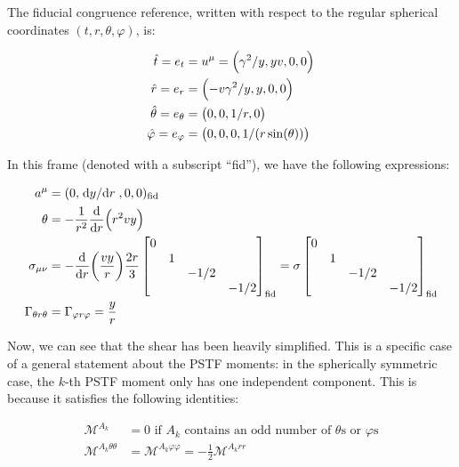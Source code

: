 \documentclass[main.tex]{subfiles}
\begin{document}
The fiducial congruence reference, written with respect to the regular spherical coordinates \((t, r, \theta, \varphi)\), is:

\begin{subequations}
\begin{align}
  \hat{t} = e_t &= u^\mu = \qty(\gamma^2 / y, yv, 0,0)  \\
  \hat{r} = e_r &= \qty(-v \gamma^2 /y, y, 0, 0) \\
  \hat{\theta} =  e_\theta &= \qty(0,0, 1/r, 0)  \\
  \hat{\varphi} =  e_ \varphi &= \qty(0,0,0, 1/(r \sin(\theta)))
\end{align}
\end{subequations}

In this frame (denoted with a subscript ``fid''), we have the following expressions:

\begin{subequations} \label{eq:spherical-coordinates-simplifications}
\begin{align}
  a^\mu &= (0,\dv*{y}{r},0,0)_{\text{fid}} \\
  \theta &= - \frac{1}{r^2} \dv{}{r} \qty(r^2 v y)  \\
  \sigma_{\mu\nu} &= - \dv{}{r} \qty(\frac{vy}{r}) \frac{2r}{3} \begin{bmatrix}
  0   &   &   &  \\
     &  1 &   &  \\
     &   & -1/2  &  \\
     &   &   & -1/2
  \end{bmatrix} _{\text{fid}}
  = \sigma \begin{bmatrix}
  0   &   &   &  \\
     &  1 &   &  \\
     &   & -1/2  &  \\
     &   &   & -1/2
  \end{bmatrix} _{\text{fid}} \\
  \Gamma_{\theta r \theta} &= \Gamma_{\varphi r \varphi} = \frac{y}{r}
\end{align}
\end{subequations}

Now, we can see that the shear has been heavily simplified. This is a specific case of a general statement about the PSTF moments: in the spherically symmetric case, the \(k\)-th PSTF moment only has one independent component. This is because it satisfies the following identities:

\begin{subequations}
\begin{align}
  \mathscr M ^{A_k} &= 0 \text{ if } A_k \text{ contains an odd number of } \theta \text{s or } \varphi \text{s}  \label{eq:id1-pstf-spherically-symmetric}  \\
  \mathscr M ^{A_k \theta \theta} &= \mathscr M ^{A_k \varphi \varphi} = -\frac{1}{2} \mathscr M ^{A_k rr} \label{eq:id2-pstf-spherically-symmetric}
\end{align}
\end{subequations}
\end{document}
